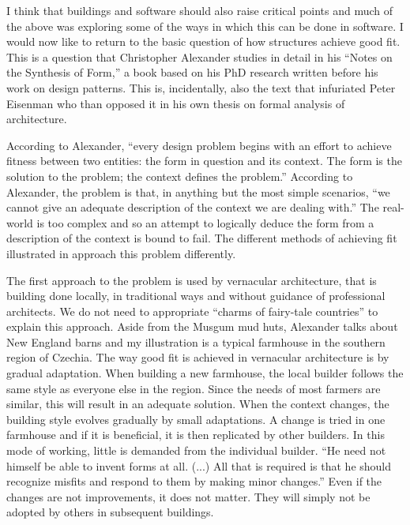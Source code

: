 I think that buildings and software should also raise critical points and much of the above was
exploring some of the ways in which this can be done in software. I would now like to return
to the basic question of how structures achieve good fit. This is a question that Christopher
Alexander studies in detail in his ``Notes on the Synthesis of Form,'' a book based
on his PhD research written before his work on design patterns. This is, incidentally,
also the text that infuriated Peter Eisenman who than opposed it in his own thesis on formal
analysis of architecture.

According to Alexander, ``every design problem begins with an effort to achieve fitness
between two entities: the form in question and its context. The form is the solution to
the problem; the context defines the problem.'' According to Alexander,
the problem is that, in anything but the most simple scenarios, ``we cannot give an adequate
description of the context we are dealing with.'' The real-world is too
complex and so an attempt to logically deduce the form from a description of the context is bound
to fail. The different methods of achieving fit illustrated in 
approach this problem differently.

The first approach to the problem is used by vernacular architecture, that is building done
locally, in traditional ways and without guidance of professional architects. We do not need
to appropriate ``charms of fairy-tale countries'' to explain this approach. Aside from
the Musgum mud huts, Alexander talks about New England barns and my illustration is a typical
farmhouse in the southern region of Czechia. The way good fit is achieved in vernacular
architecture is by gradual adaptation. When building a new farmhouse, the local builder follows
the same style as everyone else in the region. Since the needs of most farmers are similar,
this will result in an adequate solution. When the context changes, the building style evolves
gradually by small adaptations. A change is tried in one farmhouse and if it is beneficial, it is
then replicated by other builders. In this mode of working, little is demanded from the individual
builder. ``He need not himself be able to invent forms at all. (...) All that is required is that
he should recognize misfits and respond to them by making minor changes.''
Even if the changes are not improvements, it does not matter. They will simply not be adopted
by others in subsequent buildings.

